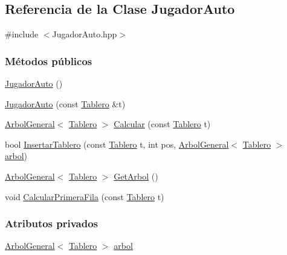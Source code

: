 \hypertarget{classJugadorAuto}{\subsection{Referencia de la Clase Jugador\-Auto}
\label{classJugadorAuto}
}


{\ttfamily \#include $<$Jugador\-Auto.\-hpp$>$}

\subsubsection*{Métodos públicos}
\begin{DoxyCompactItemize}
\item 
\hyperlink{classJugadorAuto_a28f4b4c52165488379729d71237a41a9}{Jugador\-Auto} ()
\item 
\hyperlink{classJugadorAuto_a0c2bc2690a8e6ba93b05a83b9310a03e}{Jugador\-Auto} (const \hyperlink{classTablero}{Tablero} \&t)
\item 
\hyperlink{classArbolGeneral}{Arbol\-General}$<$ \hyperlink{classTablero}{Tablero} $>$ \hyperlink{classJugadorAuto_ac92957c1af042e4f6dc9b6c0a14cc83d}{Calcular} (const \hyperlink{classTablero}{Tablero} t)
\item 
bool \hyperlink{classJugadorAuto_a608074062a8a36f3c3a3cb8270e96cbc}{Insertar\-Tablero} (const \hyperlink{classTablero}{Tablero} t, int pos, \hyperlink{classArbolGeneral}{Arbol\-General}$<$ \hyperlink{classTablero}{Tablero} $>$ \hyperlink{classJugadorAuto_a0ceb9994f364572f00abf5c490b50319}{arbol})
\item 
\hyperlink{classArbolGeneral}{Arbol\-General}$<$ \hyperlink{classTablero}{Tablero} $>$ \hyperlink{classJugadorAuto_a74531aa932becde453fe8667f6455413}{Get\-Arbol} ()
\item 
void \hyperlink{classJugadorAuto_a39c9a3955c83d4808478ed00a69bb8fd}{Calcular\-Primera\-Fila} (const \hyperlink{classTablero}{Tablero} t)
\end{DoxyCompactItemize}
\subsubsection*{Atributos privados}
\begin{DoxyCompactItemize}
\item 
\hyperlink{classArbolGeneral}{Arbol\-General}$<$ \hyperlink{classTablero}{Tablero} $>$ \hyperlink{classJugadorAuto_a0ceb9994f364572f00abf5c490b50319}{arbol}
\end{DoxyCompactItemize}


